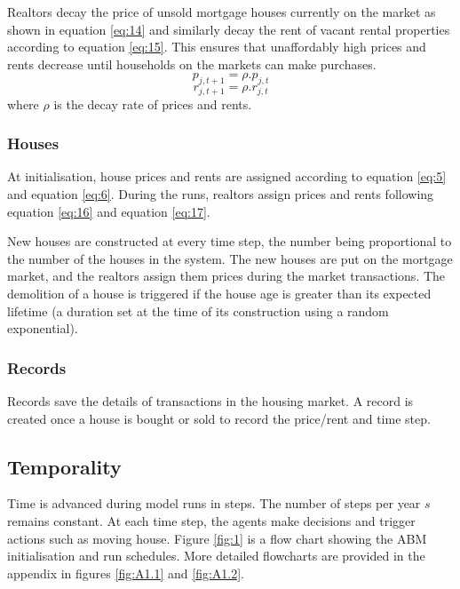 Realtors  decay the price of unsold  mortgage houses currently on the market as shown in equation \ref{eq:14} and similarly decay the rent of vacant rental properties according to equation \ref{eq:15}. This ensures that unaffordably high prices and rents decrease until households on the markets can make purchases.
\begin{equation} \label{eq:14}
    p_{j,t+1} = \rho.p_{j,t}
\end{equation}
\begin{equation} \label{eq:15}
    r_{j,t+1} = \rho.r_{j,t}
\end{equation}
where \(\rho\) is the decay rate of prices and rents.

\subsubsection{Houses}
At initialisation, house prices and rents are assigned according to equation \ref{eq:5} and equation \ref{eq:6}. During the runs, realtors assign  prices and rents following equation \ref{eq:16} and equation \ref{eq:17}. 

New houses are constructed at every time step, the number being proportional to the number of the houses in the system. The new houses are put on the mortgage market, and the realtors assign them prices during the market transactions. The demolition of a house is triggered if the house age is greater than its expected lifetime (a duration set at the time of its construction using a random exponential).

\subsubsection{Records}
Records save the details of  transactions in the housing market. A record is created once a house is bought or sold to record the price/rent and time step.

\subsection{Temporality} \label{Temporality}
Time is advanced during model runs in steps. The number of steps per year \(s\) remains constant. At each time step, the agents make decisions and trigger actions such as moving house. Figure \ref{fig:1} is a flow chart showing the ABM initialisation and run schedules. More detailed flowcharts are provided in the appendix in figures \ref{fig:A1.1} and \ref{fig:A1.2}.

